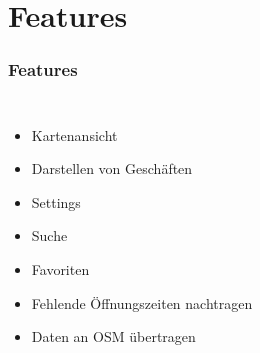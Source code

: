 \documentclass[hyperref]{beamer}
\begin{document}
\section{Features}

\begin{frame}
  \frametitle{Features}
  \begin{columns}
  \column{5.1cm}
  	\begin{itemize}
  	  \item Kartenansicht
      \item Darstellen von Geschäften
      \item Settings
      \item Suche
      \item Favoriten
      \item Fehlende Öffnungszeiten nachtragen
      \item Daten an OSM übertragen
    \end{itemize}
  \column{5cm}
  \end{columns}
\end{frame}
\end{document}
